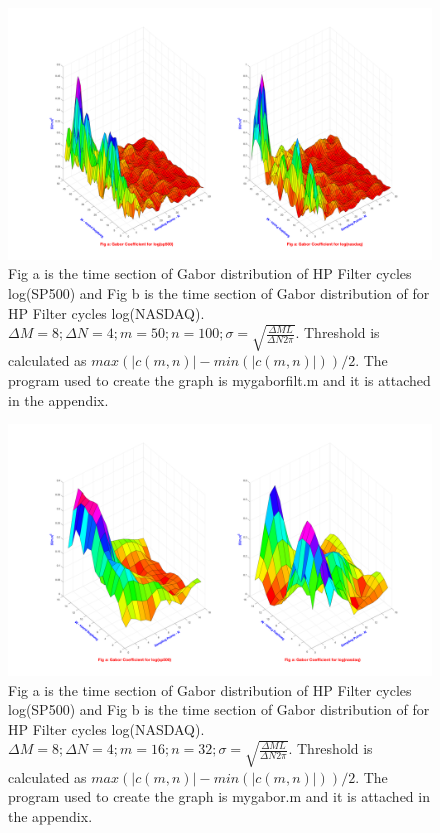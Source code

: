 \begin{figure}[!ht]
\includegraphics[scale=.15]{Images/GaborThreshold50}
\caption{Fig a is the time section of Gabor distribution of HP Filter cycles log(SP500) and Fig b is the time section of Gabor distribution of for HP Filter cycles log(NASDAQ). $\Delta M = 8; \Delta N = 4; m = 50; n = 100; \sigma = \sqrt{\frac{\Delta M L}{\Delta N 2\pi}}$. Threshold is calculated as $max(|c(m,n)|-min(|c(m,n)|))/2$. The program used to create the graph is mygaborfilt.m and it is attached in the appendix.}
\label{fig:GaborThreshold50}
\end{figure}

\begin{figure}[!ht]
\includegraphics[scale=.15]{Images/GaborThreshold16}
\caption{Fig a is the time section of Gabor distribution of HP Filter cycles log(SP500) and Fig b is the time section of Gabor distribution of for HP Filter cycles log(NASDAQ). $\Delta M = 8; \Delta N = 4; m = 16; n = 32; \sigma = \sqrt{\frac{\Delta M L}{\Delta N 2\pi}}$. Threshold is calculated as $max(|c(m,n)|-min(|c(m,n)|))/2$. The program used to create the graph is mygabor.m and it is attached in the appendix.}
\label{fig:GaborThreshold16}
\end{figure}


